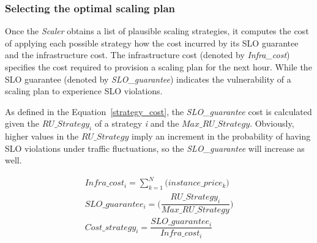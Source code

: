 \subsubsection{Selecting the optimal scaling plan}



Once the \emph{Scaler} obtains a list of plausible scaling strategies, it computes the cost of applying each possible strategy how the cost incurred by its SLO guarantee and the infrastructure cost. The infrastructure cost (denoted by \emph{Infra\_cost}) specifies the cost required to provision a scaling plan for the next hour. While the SLO guarantee (denoted by \emph{SLO\_guarantee}) indicates the vulnerability of a scaling plan to experience SLO violations. 

As defined in the Equation~\ref{strategy_cost}, the \emph{SLO\_guarantee} cost is calculated given the \emph{$RU\_Strategy_{i}$} of a strategy \emph{i} and the \emph{$Max\_RU\_Strategy$}. Obviously, higher values in the \emph{$RU\_Strategy$} imply an increment in the probability of having SLO violations under traffic fluctuations, so the \emph{SLO\_guarantee} will increase as well. 


\vspace{-5mm}
{\scriptsize
\begin{equation}\label{strategy_cost}
\begin{split}
Infra\_cost_{i} = \sum_{k=1}^N \big( instance\_price_{k} \big) \\
SLO\_guarantee_{i} =  \bigg( \dfrac{ RU\_Strategy_{i} } {Max\_RU\_Strategy} \bigg)  \\
Cost\_strategy_{i} = \dfrac{  SLO\_guarantee_{i}  } {Infra\_cost_{i}}
\end{split}
\end{equation}
}

